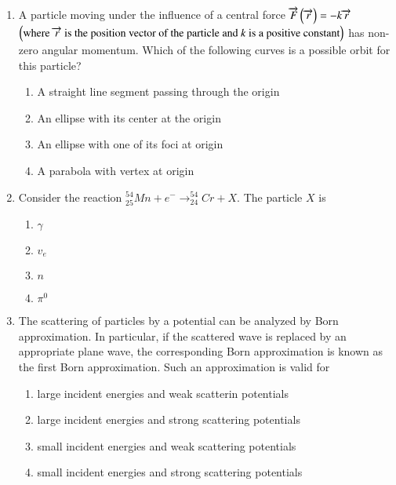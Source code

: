 \documentclass[journal]{IEEEtran}
\begin{document}
\begin{enumerate}
{\begin{multicols}{4}
\begin{enumerate}
\item $1.45$
\item $2.45$
\item $3.45$
\item $4.45$
\end{enumerate}
\end{multicols}
}
\item{
A particle moving under the influence of a central force $\overrightarrow{F}\left(\overrightarrow{r}\right) = -k\overrightarrow{r}$ $\left(\text{where $\overrightarrow{r}$ is the position vector of the particle and $k$ is a positive constant}\right)$ has non-zero angular momentum. Which of the following curves is a possible orbit for this particle?
\begin{enumerate}
\item A straight line segment passing through the origin
\item An ellipse with its center at the origin 
\item An ellipse with one of its foci at origin
\item A parabola with vertex at origin
\end{enumerate}
}
\item{
Consider the reaction $_{25}^{54}Mn+e^-\rightarrow_{24}^{54}Cr+X$. The particle $X$ is
\begin{multicols}{4}
\begin{enumerate}
\item $\gamma$
\item $v_e$
\item $n$
\item $\pi^0$
\end{enumerate}
\end{multicols}
}
\item{
The scattering of particles by a potential can be analyzed by Born approximation. In particular, if the scattered wave is replaced by an appropriate plane wave, the corresponding Born approximation is known as the first Born approximation. Such an approximation is valid for
\begin{enumerate}
\item large incident energies and weak scatterin potentials
\item large incident energies and strong scattering potentials
\item small incident energies and weak scattering potentials
\item small incident energies and strong scattering potentials

\end{enumerate}}
\end{enumerate}
\end{document}
